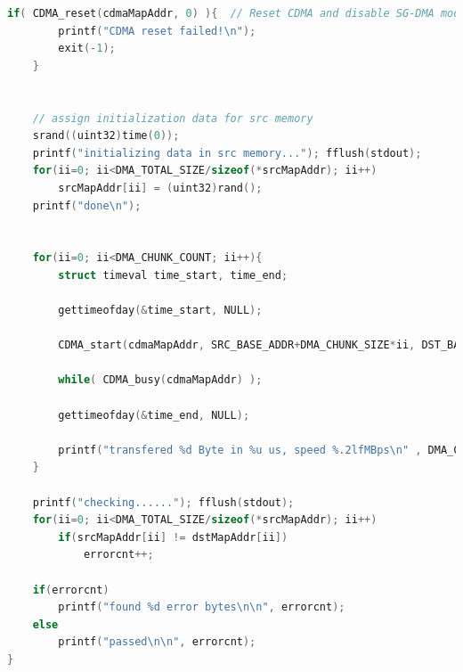 \begin{lstlisting}[language=c, label=lst:sh, caption={Codice completo test CDMA}]
    if( CDMA_reset(cdmaMapAddr, 0) ){  // Reset CDMA and disable SG-DMA mode
        printf("CDMA reset failed!\n");
        exit(-1);
    }
    
    
    // assign initialization data for src memory
    srand((uint32)time(0));
    printf("initializing data in src memory..."); fflush(stdout);
    for(ii=0; ii<DMA_TOTAL_SIZE/sizeof(*srcMapAddr); ii++)
        srcMapAddr[ii] = (uint32)rand();
    printf("done\n");
    
    
    for(ii=0; ii<DMA_CHUNK_COUNT; ii++){
        struct timeval time_start, time_end; 
        
        gettimeofday(&time_start, NULL);
        
        CDMA_start(cdmaMapAddr, SRC_BASE_ADDR+DMA_CHUNK_SIZE*ii, DST_BASE_ADDR+DMA_CHUNK_SIZE*ii, DMA_CHUNK_SIZE);
        
        while( CDMA_busy(cdmaMapAddr) ); 
        
        gettimeofday(&time_end, NULL);
        
        printf("transfered %d Byte in %u us, speed %.2lfMBps\n" , DMA_CHUNK_SIZE, time_diff_us(time_start, time_end) , ((double)DMA_CHUNK_SIZE) / time_diff_us(time_start, time_end) );
    }

    printf("checking......"); fflush(stdout);
    for(ii=0; ii<DMA_TOTAL_SIZE/sizeof(*srcMapAddr); ii++)
        if(srcMapAddr[ii] != dstMapAddr[ii])
            errorcnt++;
    
    if(errorcnt)
        printf("found %d error bytes\n\n", errorcnt);
    else
        printf("passed\n\n", errorcnt);
}

\end{lstlisting}


